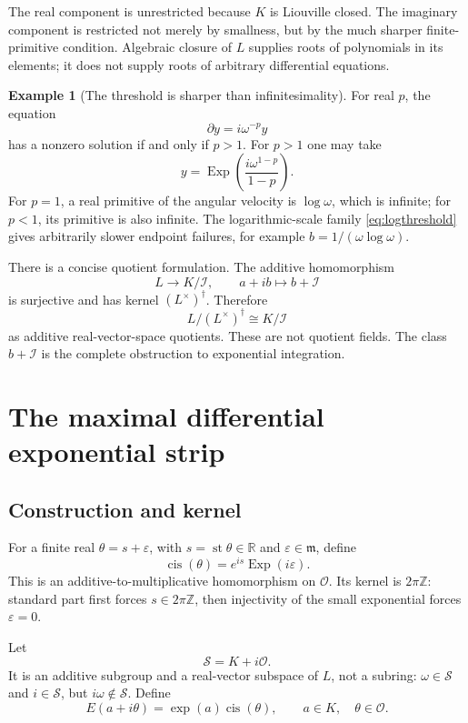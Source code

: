\documentclass[11pt]{article}
\numberwithin{equation}{section}
\theoremstyle{definition}
\newtheorem{example}[theorem]{Example}
\newcommand{\R}{\mathbb R}
\newcommand{\Z}{\mathbb Z}
\newcommand{\OO}{\mathcal O}
\newcommand{\mm}{\mathfrak m}
\newcommand{\II}{\mathcal I}
\newcommand{\DD}{\partial}
\newcommand{\Exp}{\operatorname{Exp}}
\newcommand{\st}{\operatorname{st}}
\newcommand{\cis}{\operatorname{cis}}
\begin{document}
The real component is unrestricted because $K$ is Liouville closed. The
imaginary component is restricted not merely by smallness, but by the
much sharper finite-primitive condition. Algebraic closure of $L$ supplies
roots of polynomials in its elements; it does not supply roots of
arbitrary differential equations.

\begin{example}[The threshold is sharper than infinitesimality]
For real $p$, the equation
\[
 \DD y=i\omega^{-p}y
\]
has a nonzero solution if and only if $p>1$. For $p>1$ one may take
\[
 y=\Exp\!\left(\frac{i\omega^{1-p}}{1-p}\right).
\]
For $p=1$, a real primitive of the angular velocity is $\log\omega$,
which is infinite; for $p<1$, its primitive is also infinite. The
logarithmic-scale family \eqref{eq:logthreshold} gives arbitrarily slower
endpoint failures, for example $b=1/(\omega\log\omega)$.
\end{example}

There is a concise quotient formulation. The additive homomorphism
\[
 L\longrightarrow K/\II,\qquad a+ib\longmapsto b+\II
\]
is surjective and has kernel $(L^\times)^\dagger$. Therefore
\begin{equation}\label{eq:logderivativequotient}
 L/(L^\times)^\dagger\cong K/\II
\end{equation}
as additive real-vector-space quotients. These are not quotient fields.
The class $b+\II$ is the complete obstruction to exponential integration.

\section{The maximal differential exponential strip}
\label{sec:strip}

\subsection{Construction and kernel}
For a finite real $\theta=s+\varepsilon$, with $s=\st\theta\in\R$
and $\varepsilon\in\mm$, define
\[
 \cis(\theta)=e^{is}\Exp(i\varepsilon).
\]
This is an additive-to-multiplicative homomorphism on $\OO$. Its kernel
is $2\pi\Z$: standard part first forces $s\in2\pi\Z$, then
injectivity of the small exponential forces $\varepsilon=0$.

Let
\[
 \mathcal S=K+i\OO.
\]
It is an additive subgroup and a real-vector subspace of $L$, not a
subring: $\omega\in\mathcal S$ and $i\in\mathcal S$, but
$i\omega\notin\mathcal S$. Define
\begin{equation}\label{eq:stripExp}
 E(a+i\theta)=\exp(a)\cis(\theta),
 \qquad a\in K,\quad\theta\in\OO.
\end{equation}
\end{document}

